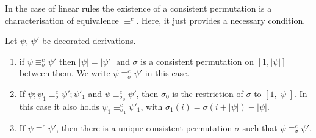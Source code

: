 \documentclass[conference]{IEEEtran}
\newcommand{\interval}[2][1]{\ensuremath{[{#1},{#2}]}}
\newcommand{\perm}{\sigma}
\begin{document}
{\begin{definition}
\end{definition}

In the case of linear rules the existence of a consistent permutation
is a characterisation of equivalence $\equiv^c$. Here, it just
provides a necessary condition.

\begin{lemma}
\label{le:consistent_permutations}
Let $\psi$, $\psi'$ be decorated derivations. 
\begin{enumerate}
\item if $\psi \equiv^c_\sigma \psi'$ then
$|\psi| = |\psi'|$ and $\perm$ is a consistent permutation on 
$\interval{|\psi|}$ between them. We write  $\psi \equiv^{c}_\perm \psi'$ in this case.
\item If $\psi; \psi_1  \equiv^{c}_\perm \psi'; \psi'_1$ and $\psi  \equiv^{c}_{\perm_0} \psi'$, 
then $\perm_0$ is the restriction of $\perm$ to $\interval{|\psi|}$. In this case it also holds
$\psi_1  \equiv^{c}_{\perm_1} \psi'_1$, with $\perm_1(i) = \perm(i + |\psi|) -  |\psi|$.
\item
If $\psi \equiv^{c} \psi'$, then there is a unique consistent permutation $\perm$ such that 
$\psi \equiv^{c}_\perm \psi'$.
\end{enumerate}
\end{lemma}
} %
\end{document}
